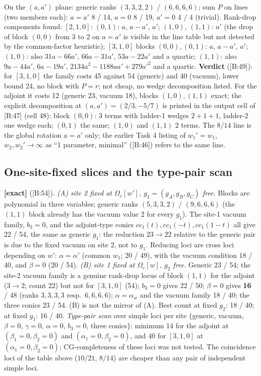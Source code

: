 \documentclass[10pt]{article}
\newcommand{\cl}[2]{\textsf{[#1:#2]}}
\newcommand{\tg}[1]{\textbf{[#1]}}
\newcommand{\Om}{\Omega}
\begin{document}
On the $(a,a')$ plane: generic ranks $(3,3,2,2)$ / $(6,6,6,6)$; sum $P$ on lines (two members each): $a=a'$ 8 / 14, $a=0$ 8 / 19, $a'=0$ 4 / 4 (trivial). Rank-drop components found: $[2,1,0]$: $(0,\allowbreak 1)$: $a$, $a-a'$, $a'$; $(1,\allowbreak 0)$, $(1,\allowbreak 1)$: $a'$ (the drop of block $(0,\allowbreak 0)$ from 3 to 2 on $a=a'$ is visible in the line table but not detected by the common-factor heuristic); $[3,1,0]$ blocks $(0,0),(0,1)$: $a$, $a-a'$, $a'$; $(1,\allowbreak 0)$: also $31a-66a'$, $66a-31a'$, $53a-22a'$ and a quartic; $(1,\allowbreak 1)$: also $9a-44a'$, $6a-19a'$, $2134a^2-1188aa'+279a'^2$ and a quartic. \textbf{Verdict} (\cl{B}{49}): for $[3,1,0]$ the family costs 45 against 54 (generic) and 40 (vacuum), lower bound 24, no block with $P=r$; not cheap, no wedge decomposition listed. For the adjoint it costs 12 (generic 23, vacuum 18), blocks $(1,0),(1,1)$ exact; the explicit decomposition at $(a,a')=(2/3,-5/7)$ is printed in the output cell of \cl{B}{47} (cell 48): block $(0,\allowbreak 0)$: 3 terms with ladder-1 wedges $2+1+1$, ladder-2 one wedge each; $(0,\allowbreak 1)$ the same; $(1,\allowbreak 0)$ and $(1,\allowbreak 1)$ 2 terms. The $8/14$ line is the global rotation $a=a'$ only; the earlier Task 4 listing of $w_1'=w_1$, $w_2,w_2'\to\infty$ as ``1 parameter, minimal'' (\cl{B}{46}) refers to the same line.

\subsection{One-site-fixed slices and the type-pair scan}\label{sec:Bfixed}

\tg{exact} (\cl{B}{54}). \emph{(A) site 2 fixed at $\Om_c[w']$, $g_1=(g_A,g_B,g_C)$ free.} Blocks are polynomial in three variables; generic ranks $(5,3,3,2)$ / $(9,6,6,6)$ (the $(1,\allowbreak 1)$ block already has the vacuum value 2 for every $g_1$). The site-1 vacuum family, $b_3=0$, and the adjoint-type conics $cc_1(t),cc_1(-t),cc_1(1-t)$ all give 22 / 54, the same as generic $g_1$: the reduction $23\to22$ relative to the generic pair is due to the fixed vacuum on site 2, not to $g_1$. Reducing loci are cross loci depending on $w'$: $\alpha=\alpha'$ (common $w_1$; 20 / 49), with the vacuum condition 18 / 40, and $\beta=0$ (20 / 54). \emph{(B) site 1 fixed at $\Om_c[w]$, $g_2$ free.} Generic 23 / 54; the site-2 vacuum family is a genuine rank-drop locus of block $(1,\allowbreak 1)$ for the adjoint ($3\to2$; count 22) but not for $[3,1,0]$ (54); $b_3=0$ gives 22 / 50; $\beta=0$ gives \textbf{16} / 48 (ranks $3,3,3,3$ resp.\ $6,6,6,6$); $\alpha=\alpha_w$ and the vacuum family 18 / 40; the three conics 23 / 54. (B) is not the mirror of (A). Best count at fixed $g_2$: 18 / 40; at fixed $g_1$: 16 / 40. \emph{Type-pair scan} over simple loci per site $\{$generic, vacuum, $\beta=0$, $\gamma=0$, $\alpha=0$, $b_3=0$, three conics$\}$: minimum 14 for the adjoint at $(\beta_1=0,\beta_2=0)$ and $(\alpha_1=0,\beta_2=0)$, and 40 for $[3,1,0]$ at $(\alpha_1=0,\beta_2=0)$; CG-completeness of these loci was not tested. The coincidence loci of the table above ($10/21$, $8/14$) are cheaper than any pair of independent simple loci.
\end{document}
